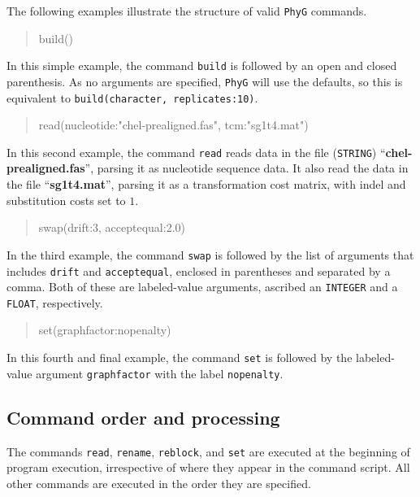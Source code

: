 \documentclass[11pt]{book}
\newcommand{\phyg}{\texttt{PhyG} }
\begin{document}
{{		\noindent The following examples illustrate the structure of valid \phyg commands. 
					
		\begin{quote}
		build()
		\end{quote}
		
		\noindent In this simple example, the command \texttt{build} is followed by an open 
		and closed parenthesis. As no arguments are specified, \phyg will use the defaults, 
		so this is equivalent to \texttt{build(character, replicates:10)}.	
			
		\begin{quote}
		read(nucleotide:"chel-prealigned.fas", tcm:"sg1t4.mat")
		\end{quote}		

		\noindent In this second example, the command \texttt{read} reads data in the file
		(\texttt{STRING}) ``\textbf{chel-prealigned.fas}'', parsing it as nucleotide sequence data. 
		It also read the data in the file ``\textbf{sg1t4.mat}'', parsing it as a transformation cost matrix, 
		with indel and substitution costs set to $1$.
		
		\begin{quote}
		swap(drift:3, acceptequal:2.0)
		\end{quote}
				
		\noindent In the third example, the command \texttt{swap} is followed by the list 
		of arguments that includes \texttt{drift} and \texttt{acceptequal}, enclosed in 
		parentheses and separated by a comma. Both of these are labeled-value arguments, 
		ascribed an \texttt{INTEGER} and a \texttt{FLOAT}, respectively.
		
		\begin{quote}
		set(graphfactor:nopenalty) 
		\end{quote}
		
		\noindent In this fourth and final example, the command \texttt{set} is followed by the 
		labeled-value argument \texttt{graphfactor} with the label \texttt{nopenalty}.
				
	\subsection{Command order and processing}
		The commands \texttt{read}, \texttt{rename}, \texttt{reblock}, and \texttt{set} are 
		executed at the beginning of program execution, irrespective of where they appear 
		in the command script. All other commands are executed in the order they are specified. 
		
}}
\end{document}
